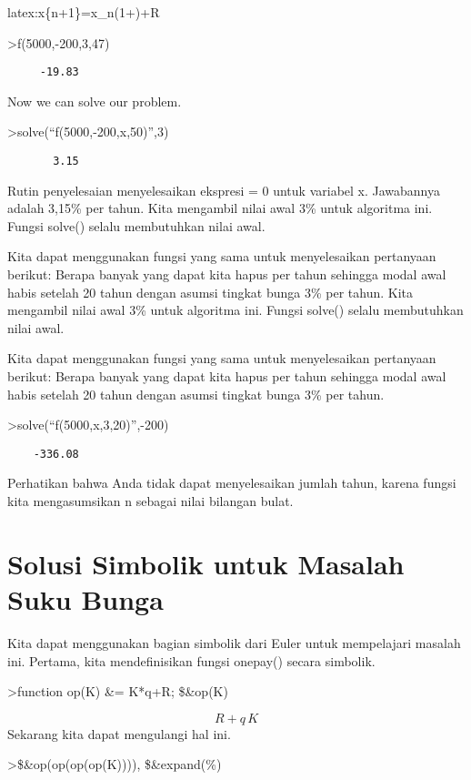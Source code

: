 \documentclass[
]{book}
\begin{document}
latex:x\{n+1\}=x\_n\cdot\kiri(1+\kanan)+R

\textgreater f(5000,-200,3,47)

\begin{verbatim}
     -19.83 
\end{verbatim}

Now we can solve our problem.

\textgreater solve(``f(5000,-200,x,50)'',3)

\begin{verbatim}
       3.15 
\end{verbatim}

Rutin penyelesaian menyelesaikan ekspresi = 0 untuk variabel x. Jawabannya adalah 3,15\% per tahun. Kita mengambil nilai awal 3\% untuk algoritma ini. Fungsi solve() selalu membutuhkan nilai awal.

Kita dapat menggunakan fungsi yang sama untuk menyelesaikan pertanyaan berikut: Berapa banyak yang dapat kita hapus per tahun sehingga modal awal habis setelah 20 tahun dengan asumsi tingkat bunga 3\% per tahun. Kita mengambil nilai awal 3\% untuk algoritma ini. Fungsi solve() selalu membutuhkan nilai awal.

Kita dapat menggunakan fungsi yang sama untuk menyelesaikan pertanyaan berikut: Berapa banyak yang dapat kita hapus per tahun sehingga modal awal habis setelah 20 tahun dengan asumsi tingkat bunga 3\% per tahun.

\textgreater solve(``f(5000,x,3,20)'',-200)

\begin{verbatim}
    -336.08 
\end{verbatim}

Perhatikan bahwa Anda tidak dapat menyelesaikan jumlah tahun, karena fungsi kita mengasumsikan n sebagai nilai bilangan bulat.

\section{Solusi Simbolik untuk Masalah Suku Bunga}\label{solusi-simbolik-untuk-masalah-suku-bunga}

Kita dapat menggunakan bagian simbolik dari Euler untuk mempelajari masalah ini. Pertama, kita mendefinisikan fungsi onepay() secara simbolik.

\textgreater function op(K) \&= K*q+R; \$\&op(K)

\[R+q\,K\]Sekarang kita dapat mengulangi hal ini.

\textgreater\$\&op(op(op(op(K)))), \$\&expand(\%)
\end{document}
